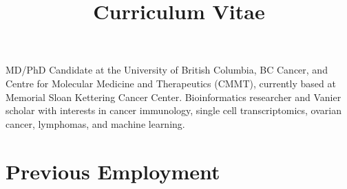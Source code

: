 \documentclass[11pt,a4paper,sans]{moderncv}        %
\title{Curriculum Vitae}                               %
\begin{document}
\makecvtitle

\small{MD/PhD Candidate at the University of British Columbia, BC Cancer, and Centre for Molecular Medicine and Therapeutics (CMMT), currently based at Memorial Sloan Kettering Cancer Center. Bioinformatics researcher and Vanier scholar with interests in cancer immunology, single cell transcriptomics, ovarian cancer, lymphomas, and machine learning.}

\section{Previous Employment}

\vspace{6pt}
\end{document}
